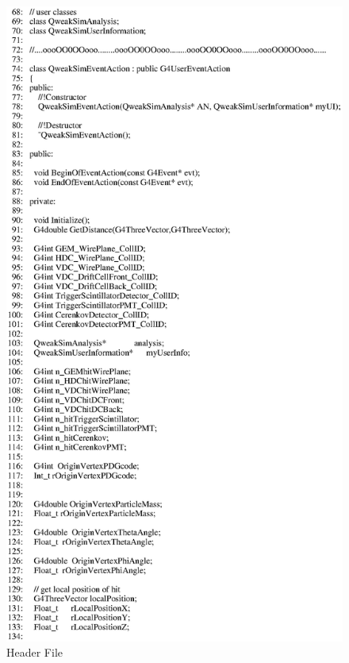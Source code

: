 \begin{figure}[h]
  \hspace{0cm}
  \includegraphics[scale=0.8]{./figures13/QweakSimEventAction.hh-p2.eps}
  \caption{Header File}
           \label{fig:XIII-SC-12}
\end{figure}

\clearpage

